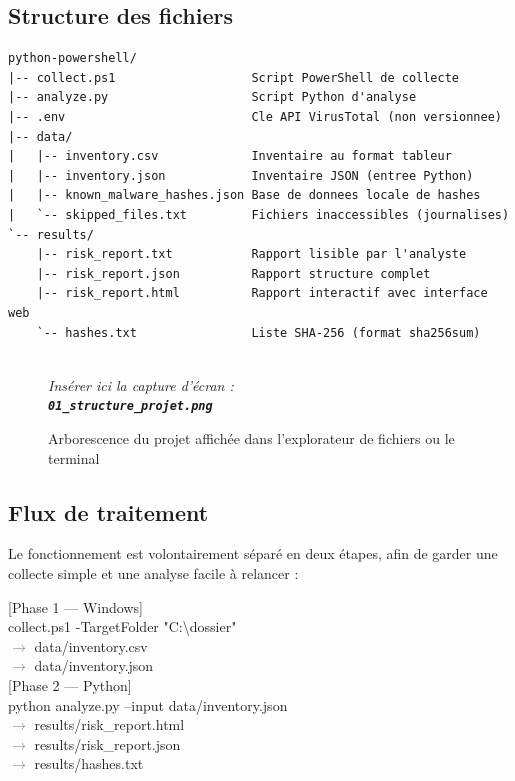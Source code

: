 \documentclass[12pt,a4paper]{article}
\newcommand{\screenshot}[2]{%
  \begin{figure}[H]
    \centering
    \begin{tcolorbox}[
      colback=screenshotbg,
      colframe=screenshotborder,
      fonttitle=\bfseries\small\color{white},
      coltitle=white,
      title={\faCamera\quad Capture d'écran — \texttt{#1}},
      left=6pt, right=6pt, top=6pt, bottom=6pt,
      width=\textwidth,
      arc=4pt
    ]
    \centering
    \vspace{0.4cm}
    \textcolor{gray}{\faImage}\\[4pt]
    {\small\color{gray}\itshape Insérer ici la capture d'écran :\\[2pt]
    \textbf{\texttt{#1}}}
    \vspace{0.4cm}
    \end{tcolorbox}
    \caption{#2}
  \end{figure}%
}
\begin{document}
\subsection{Structure des fichiers}

\begin{verbatim}
python-powershell/
|-- collect.ps1                   Script PowerShell de collecte
|-- analyze.py                    Script Python d'analyse
|-- .env                          Cle API VirusTotal (non versionnee)
|-- data/
|   |-- inventory.csv             Inventaire au format tableur
|   |-- inventory.json            Inventaire JSON (entree Python)
|   |-- known_malware_hashes.json Base de donnees locale de hashes
|   `-- skipped_files.txt         Fichiers inaccessibles (journalises)
`-- results/
    |-- risk_report.txt           Rapport lisible par l'analyste
    |-- risk_report.json          Rapport structure complet
    |-- risk_report.html          Rapport interactif avec interface web
    `-- hashes.txt                Liste SHA-256 (format sha256sum)
\end{verbatim}

\screenshot{01\_structure\_projet.png}{Arborescence du projet affichée dans l'explorateur de fichiers ou le terminal}

\subsection{Flux de traitement}

Le fonctionnement est volontairement séparé en deux étapes, afin de garder une collecte simple et une analyse facile à relancer :

\begin{center}
  \begin{tcolorbox}[colback=codebg, colframe=accent, width=\textwidth, arc=6pt,
    left=12pt, right=12pt, top=10pt, bottom=10pt]
    \color{codetext}\ttfamily\small
    \textcolor{accent}{[Phase 1 — Windows]}\\
    collect.ps1 -TargetFolder "C:\textbackslash{}dossier"\\
    \quad\textcolor{gray}{$\rightarrow$} data/inventory.csv\\
    \quad\textcolor{gray}{$\rightarrow$} data/inventory.json\\[8pt]
    \textcolor{accent}{[Phase 2 — Python]}\\
    python analyze.py --input data/inventory.json\\
    \quad\textcolor{gray}{$\rightarrow$} results/risk\_report.html\\
    \quad\textcolor{gray}{$\rightarrow$} results/risk\_report.json\\
    \quad\textcolor{gray}{$\rightarrow$} results/hashes.txt
  \end{tcolorbox}
\end{center}
\end{document}
